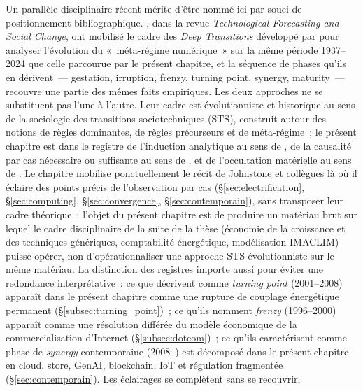 %
Un parallèle disciplinaire récent mérite d'être nommé ici par souci de positionnement bibliographique. \textcite{johnstone_deep_2026}, dans la revue \emph{Technological Forecasting and Social Change}, ont mobilisé le cadre des \emph{Deep Transitions} développé par \textcite{schot_deep_2018} pour analyser l'évolution du «~méta-régime numérique~» sur la même période 1937--2024 que celle parcourue par le présent chapitre, et la séquence de phases qu'ils en dérivent~--- gestation, irruption, frenzy, turning point, synergy, maturity~--- recouvre une partie des mêmes faits empiriques. Les deux approches ne se substituent pas l'une à l'autre. Leur cadre est évolutionniste et historique au sens de la sociologie des transitions sociotechniques (STS), construit autour des notions de règles dominantes, de règles précurseurs et de méta-régime~; le présent chapitre est dans le registre de l'induction analytique au sens de \textcite{znaniecki_method_1934}, de la causalité par cas nécessaire ou suffisante au sens de \textcite{trannoy_causalite_2025}, et de l'occultation matérielle au sens de \textcite{ensmenger_environmental_2018}. Le chapitre mobilise ponctuellement le récit de Johnstone et collègues là où il éclaire des points précis de l'observation par cas (§\ref{sec:electrification}, §\ref{sec:computing}, §\ref{sec:convergence}, §\ref{sec:contemporain}), sans transposer leur cadre théorique~: l'objet du présent chapitre est de produire un matériau brut sur lequel le cadre disciplinaire de la suite de la thèse (économie de la croissance et des techniques génériques, comptabilité énergétique, modélisation IMACLIM) puisse opérer, non d'opérationnaliser une approche STS-évolutionniste sur le même matériau. La distinction des registres importe aussi pour éviter une redondance interprétative~: ce que \textcite{johnstone_deep_2026} décrivent comme \emph{turning point} (2001--2008) apparaît dans le présent chapitre comme une rupture de couplage énergétique permanent (§\ref{subsec:turning_point})~; ce qu'ils nomment \emph{frenzy} (1996--2000) apparaît comme une résolution différée du modèle économique de la commercialisation d'Internet (§\ref{subsec:dotcom})~; ce qu'ils caractérisent comme phase de \emph{synergy} contemporaine (2008--) est décomposé dans le présent chapitre en cloud, store, GenAI, blockchain, IoT et régulation fragmentée (§\ref{sec:contemporain}). Les éclairages se complètent sans se recouvrir.


